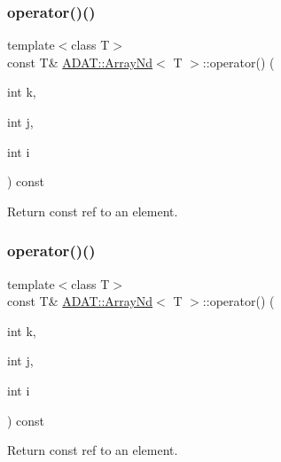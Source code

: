 \subsubsection{\texorpdfstring{operator()()}{operator()()}\hspace{0.1cm}{\footnotesize\ttfamily [17/24]}}
{\footnotesize\ttfamily template$<$class T$>$ \\
const T\& \mbox{\hyperlink{classADAT_1_1ArrayNd}{A\+D\+A\+T\+::\+Array\+Nd}}$<$ T $>$\+::operator() (\begin{DoxyParamCaption}\item[{int}]{k,  }\item[{int}]{j,  }\item[{int}]{i }\end{DoxyParamCaption}) const\hspace{0.3cm}{\ttfamily [inline]}}



Return const ref to an element. 

\mbox{\label{classADAT_1_1ArrayNd_a1452ab01ffb2824ebcfa50ebbcdd7b8a}} 
\subsubsection{\texorpdfstring{operator()()}{operator()()}\hspace{0.1cm}{\footnotesize\ttfamily [18/24]}}
{\footnotesize\ttfamily template$<$class T$>$ \\
const T\& \mbox{\hyperlink{classADAT_1_1ArrayNd}{A\+D\+A\+T\+::\+Array\+Nd}}$<$ T $>$\+::operator() (\begin{DoxyParamCaption}\item[{int}]{k,  }\item[{int}]{j,  }\item[{int}]{i }\end{DoxyParamCaption}) const\hspace{0.3cm}{\ttfamily [inline]}}



Return const ref to an element. 

\mbox{\label{classADAT_1_1ArrayNd_a0d3dfd90a9e68964948dbccb48b18f1d}} 
